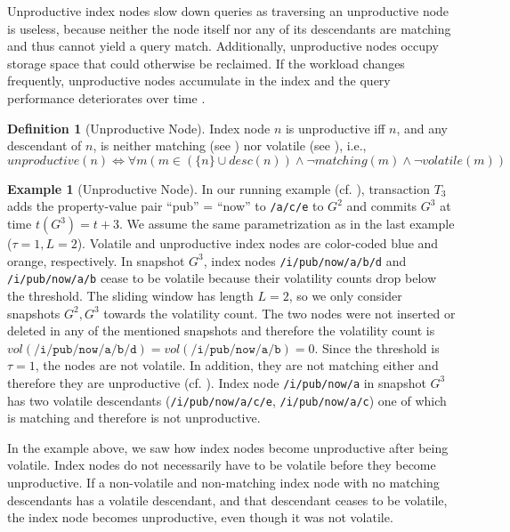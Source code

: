 \documentclass[abstracton,12pt]{scrartcl}
\theoremstyle{definition}
\newtheorem{definition}{Definition}
\newtheorem{example}{Example}
\begin{document}
Unproductive index nodes slow down
queries as traversing an unproductive node is useless, because neither the node
itself nor any of its descendants are matching and thus cannot
yield a query match. Additionally, unproductive nodes occupy storage space that
could otherwise be reclaimed. If the workload changes frequently, unproductive
nodes accumulate in the index and the query performance deteriorates
over time \cite{KW17}.

\begin{definition}[Unproductive Node]
  Index node $n$ is unproductive iff $n$, and any descendant of
  $n$, is neither matching (see ) nor volatile (see
  ), i.e.,
  $$ unproductive(n) \iff \forall  m (m \in (\{n\} \cup desc(n)) \land
  \neg matching(m) \land \neg volatile(m))$$
  \label{def:unproductive-node}
\end{definition}

\vspace{-0.5cm}

\begin{example}[Unproductive Node]
  In our running example (cf. ), transaction $T_3$ adds
  the property-value pair ``pub'' = ``now'' to \texttt{/a/c/e} to $G^2$ and commits $G^3$ at time
  $t(G^3) = t+3$. We assume the same parametrization as in the last example
  ($\tau = 1, L = 2$). Volatile and unproductive index nodes are color-coded
  blue and orange, respectively.
  In snapshot $G^3$, index nodes \texttt{/i/pub/now/a/b/d} and
  \texttt{/i/pub/now/a/b} cease to be volatile because their 
  volatility counts drop below the threshold. The sliding window has length $L =
  2$, so we only consider snapshots $G^2,G^3$ towards the volatility count. The two
  nodes were not inserted or deleted in any of the mentioned snapshots and
  therefore the volatility count is $vol(\texttt{/i/pub/now/a/b/d}) =
  vol(\texttt{/i/pub/now/a/b}) = 0$. Since the threshold is $\tau = 1$, the nodes are
  not volatile. In addition,
  they are not matching either and therefore they are unproductive (cf.
  ). Index node
  \texttt{/i/pub/now/a} in snapshot $G^3$ has
  two volatile descendants (\texttt{/i/pub/now/a/c/e}, \texttt{/i/pub/now/a/c}) 
  one of which is matching and therefore is not unproductive.
  \label{ex:unproductive-node}
\end{example}

In the example above, we saw how index nodes become unproductive after being
volatile. Index nodes do not necessarily have to be volatile before they become
unproductive.
If a non-volatile and non-matching index node with no matching descendants has a
volatile descendant, and that descendant ceases to
be volatile, the index node becomes unproductive, even though it was not
volatile.
\end{document}
